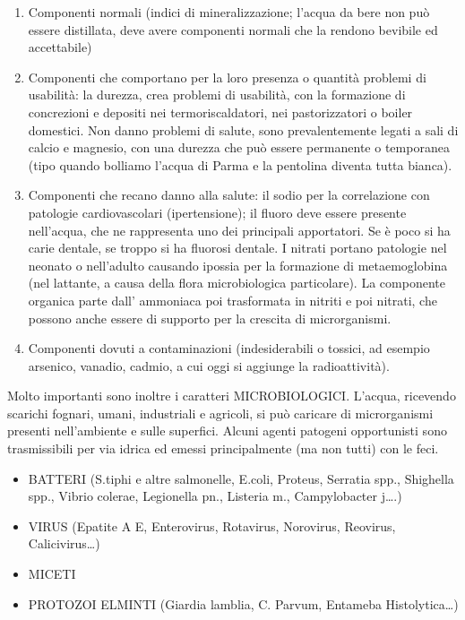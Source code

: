 \documentclass[]{article}
\begin{document}
\begin{enumerate}
\def\labelenumi{\arabic{enumi}.}
\item
  Componenti normali (indici di mineralizzazione; l'acqua da bere non
  può essere distillata, deve avere componenti normali che la rendono
  bevibile ed accettabile)
\item
  Componenti che comportano per la loro presenza o quantità problemi di
  usabilità: la durezza, crea problemi di usabilità, con la formazione
  di concrezioni e depositi nei termoriscaldatori, nei pastorizzatori o
  boiler domestici. Non danno problemi di salute, sono prevalentemente
  legati a sali di calcio e magnesio, con una durezza che può essere
  permanente o temporanea (tipo quando bolliamo l'acqua di Parma e la
  pentolina diventa tutta bianca).
\item
  Componenti che recano danno alla salute: il sodio per la correlazione
  con patologie cardiovascolari (ipertensione); il fluoro deve essere
  presente nell'acqua, che ne rappresenta uno dei principali
  apportatori. Se è poco si ha carie dentale, se troppo si ha fluorosi
  dentale. I nitrati portano patologie nel neonato o nell'adulto
  causando ipossia per la formazione di metaemoglobina (nel lattante, a
  causa della flora microbiologica particolare). La componente organica
  parte dall' ammoniaca poi trasformata in nitriti e poi nitrati, che
  possono anche essere di supporto per la crescita di microrganismi.
\item
  Componenti dovuti a contaminazioni (indesiderabili o tossici, ad
  esempio arsenico, vanadio, cadmio, a cui oggi si aggiunge la
  radioattività).
\end{enumerate}

Molto importanti sono inoltre i caratteri MICROBIOLOGICI. L'acqua,
ricevendo scarichi fognari, umani, industriali e agricoli, si può
caricare di microrganismi presenti nell'ambiente e sulle superfici.
Alcuni agenti patogeni opportunisti sono trasmissibili per via idrica ed
emessi principalmente (ma non tutti) con le feci.

\begin{itemize}
\item
  BATTERI (S.tiphi e altre salmonelle, E.coli, Proteus, Serratia spp.,
  Shighella spp., Vibrio colerae, Legionella pn., Listeria m.,
  Campylobacter j\ldots{}.)
\item
  VIRUS (Epatite A E, Enterovirus, Rotavirus, Norovirus, Reovirus,
  Calicivirus\ldots{})
\item
  MICETI
\item
  PROTOZOI ELMINTI (Giardia lamblia, C. Parvum, Entameba
  Histolytica\ldots{})
\end{itemize}
\end{document}
